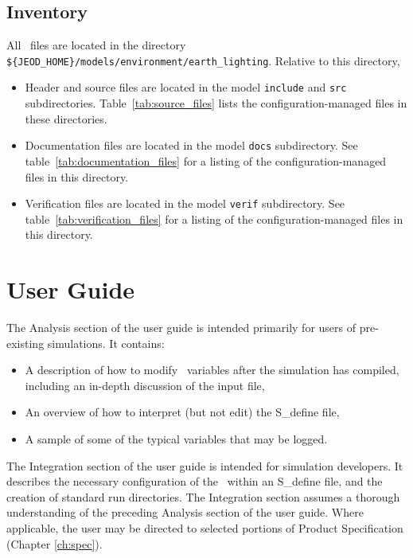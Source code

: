 \section{Inventory}
All \earthlightingDesc\ files are located in the directory \newline
{\tt \$\{JEOD\_HOME\}/models/environment/earth\_lighting}.
Relative to this directory,
\begin{itemize}
\vspace{-0.2\baselineskip}
\item Header and source files are located
in the model {\tt include} and {\tt src} subdirectories.
Table~\ref{tab:source_files} lists the
configuration-managed files in these directories.
\vspace{-0.1\baselineskip}
\item Documentation files are located in the model {\tt docs} subdirectory.
See table~\ref{tab:documentation_files}
for a listing of the
configuration-managed files in this directory.
\vspace{-0.1\baselineskip}
\item Verification files are located in the model {\tt verif} subdirectory.
See table~\ref{tab:verification_files}
for a listing of the
configuration-managed files in this directory.
\end{itemize}



\chapter{User Guide}\label{ch:user}
The Analysis section of the user guide is intended primarily for users of pre-existing simulations.
It contains:
\begin{itemize}
\item A description of how to modify \earthlightingDesc\ variables after the simulation
has compiled, including an in-depth discussion of the input file,
\item An overview of how to interpret (but not edit) the S\_define file,
\item A sample of some of the typical variables that may be logged.
\end{itemize}

The Integration section of the user guide is intended for simulation developers.
It describes the necessary configuration of the \earthlightingDesc\ within an
S\_define file, and the creation of standard run directories.  The Integration
section assumes a thorough understanding of the preceding Analysis section of the user guide.
Where applicable, the user may be directed to selected portions of Product Specification (Chapter \ref{ch:spec}).

